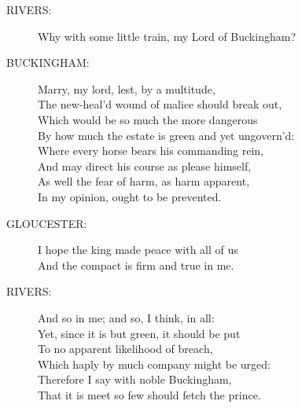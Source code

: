 \documentclass{article}
\begin{document}
\begin{description}
\item[RIVERS:] 
\hspace{1pt}Why with some little train, my Lord of Buckingham?\\
\end{description}
\begin{description}
\item[BUCKINGHAM:] 
\hspace{1pt}Marry, my lord, lest, by a multitude,\\
\hspace{1pt}The new-heal'd wound of malice should break out,\\
\hspace{1pt}Which would be so much the more dangerous\\
\hspace{1pt}By how much the estate is green and yet ungovern'd:\\
\hspace{1pt}Where every horse bears his commanding rein,\\
\hspace{1pt}And may direct his course as please himself,\\
\hspace{1pt}As well the fear of harm, as harm apparent,\\
\hspace{1pt}In my opinion, ought to be prevented.\\
\end{description}
\begin{description}
\item[GLOUCESTER:] 
\hspace{1pt}I hope the king made peace with all of us\\
\hspace{1pt}And the compact is firm and true in me.\\
\end{description}
\begin{description}
\item[RIVERS:] 
\hspace{1pt}And so in me; and so, I think, in all:\\
\hspace{1pt}Yet, since it is but green, it should be put\\
\hspace{1pt}To no apparent likelihood of breach,\\
\hspace{1pt}Which haply by much company might be urged:\\
\hspace{1pt}Therefore I say with noble Buckingham,\\
\hspace{1pt}That it is meet so few should fetch the prince.\\
\end{description}
\end{document}
